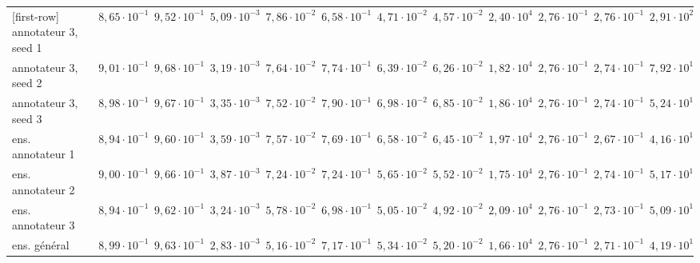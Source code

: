 \documentclass[a4paper,french,bookmarks,12pt]{article}
\begin{document}
\begin{landscape}
\begin{center}
\begin{NiceTabular}{lccccccccccc}[first-row]
            annotateur 3, seed 1 & $8{,}65 \cdot 10^{-1}$ & $9{,}52 \cdot 10^{-1}$ & $5{,}09 \cdot 10^{-3}$ & $7{,}86 \cdot 10^{-2}$ & $6{,}58 \cdot 10^{-1}$ & \textbf{$4{,}71 \cdot 10^{-2}$} & \textbf{$4{,}57 \cdot 10^{-2}$} & $2{,}40 \cdot 10^{4}$ & $2{,}76 \cdot 10^{-1}$ & $2{,}76 \cdot 10^{-1}$ & $2{,}91 \cdot 10^{2}$ \\
            annotateur 3, seed 2 & $9{,}01 \cdot 10^{-1}$ & $9{,}68 \cdot 10^{-1}$ & \textbf{$3{,}19 \cdot 10^{-3}$} & $7{,}64 \cdot 10^{-2}$ & $7{,}74 \cdot 10^{-1}$ & $6{,}39 \cdot 10^{-2}$ & $6{,}26 \cdot 10^{-2}$ & $1{,}82 \cdot 10^{4}$ & $2{,}76 \cdot 10^{-1}$ & $2{,}74 \cdot 10^{-1}$ & $7{,}92 \cdot 10^{1}$ \\
            annotateur 3, seed 3 & $8{,}98 \cdot 10^{-1}$ & $9{,}67 \cdot 10^{-1}$ & $3{,}35 \cdot 10^{-3}$ & $7{,}52 \cdot 10^{-2}$ & $7{,}90 \cdot 10^{-1}$ & $6{,}98 \cdot 10^{-2}$ & $6{,}85 \cdot 10^{-2}$ & $1{,}86 \cdot 10^{4}$ & $2{,}76 \cdot 10^{-1}$ & $2{,}74 \cdot 10^{-1}$ & $5{,}24 \cdot 10^{1}$ \\
            \midrule
            ens. annotateur 1 & $8{,}94 \cdot 10^{-1}$ & $9{,}60 \cdot 10^{-1}$ & $3{,}59 \cdot 10^{-3}$ & $7{,}57 \cdot 10^{-2}$ & $7{,}69 \cdot 10^{-1}$ & $6{,}58 \cdot 10^{-2}$ & $6{,}45 \cdot 10^{-2}$ & $1{,}97 \cdot 10^{4}$ & $2{,}76 \cdot 10^{-1}$ & $2{,}67 \cdot 10^{-1}$ & $4{,}16 \cdot 10^{1}$ \\
            ens. annotateur 2 & $9{,}00 \cdot 10^{-1}$ & $9{,}66 \cdot 10^{-1}$ & $3{,}87 \cdot 10^{-3}$ & $7{,}24 \cdot 10^{-2}$ & $7{,}24 \cdot 10^{-1}$ & $5{,}65 \cdot 10^{-2}$ & $5{,}52 \cdot 10^{-2}$ & $1{,}75 \cdot 10^{4}$ & $2{,}76 \cdot 10^{-1}$ & $2{,}74 \cdot 10^{-1}$ & $5{,}17 \cdot 10^{1}$ \\
            ens. annotateur 3 & $8{,}94 \cdot 10^{-1}$ & $9{,}62 \cdot 10^{-1}$ & $3{,}24 \cdot 10^{-3}$ & \textbf{$5{,}78 \cdot 10^{-2}$} & $6{,}98 \cdot 10^{-1}$ & $5{,}05 \cdot 10^{-2}$ & $4{,}92 \cdot 10^{-2}$ & $2{,}09 \cdot 10^{4}$ & $2{,}76 \cdot 10^{-1}$ & $2{,}73 \cdot 10^{-1}$ & $5{,}09 \cdot 10^{1}$ \\
            \midrule
            ens. général & $8{,}99 \cdot 10^{-1}$ & $9{,}63 \cdot 10^{-1}$ & $2{,}83 \cdot 10^{-3}$ & $5{,}16 \cdot 10^{-2}$ & $7{,}17 \cdot 10^{-1}$ & $5{,}34 \cdot 10^{-2}$ & $5{,}20 \cdot 10^{-2}$ & \textbf{$1{,}66 \cdot 10^{4}$} & $2{,}76 \cdot 10^{-1}$ & \textbf{$2{,}71 \cdot 10^{-1}$} & \textbf{$4{,}19 \cdot 10^{1}$} \\
            \bottomrule
            \end{NiceTabular}
            \label{tab:mean_sci_fr_complete}
        \end{center}
    \end{landscape}
\end{document}
